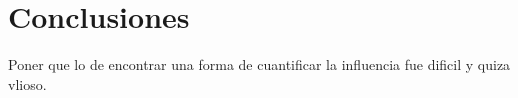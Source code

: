 \chapter{Conclusiones}

Poner que lo de encontrar una forma de cuantificar la influencia fue dificil y quiza vlioso. 



